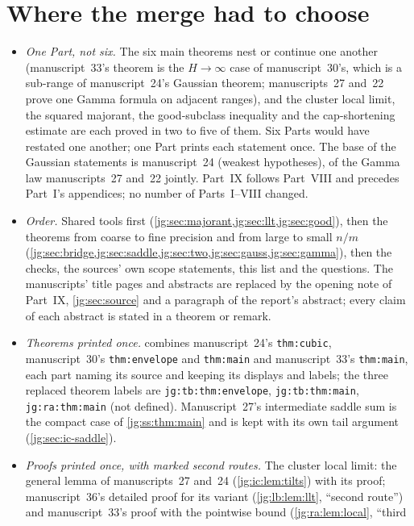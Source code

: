 \documentclass[11pt,a4paper]{article}
\theoremstyle{definition}\newaliascnt{definition}{theorem}
\theoremstyle{remark}\newaliascnt{remark}{theorem}
\begin{document}
\section{Where the merge had to choose}
\label{jg:sec:merge}
\begin{itemize}
\item \emph{One Part, not six.} The six main theorems nest or continue one
 another (manuscript~33's theorem is the $H\to\infty$ case of manuscript~30's,
 which is a sub-range of manuscript~24's Gaussian theorem; manuscripts~27
 and~22 prove one Gamma formula on adjacent ranges), and the cluster local
 limit, the squared majorant, the good-subclass inequality and the
 cap-shortening estimate are each proved in two to five of them. Six Parts would
 have restated one another; one Part prints each statement once. The base of
 the Gaussian statements is manuscript~24 (weakest hypotheses), of the Gamma law
 manuscripts~27 and~22 jointly. Part~IX follows Part~VIII and precedes Part~I's
 appendices; no number of Parts~I--VIII changed.
\item \emph{Order.} Shared tools first (\cref{jg:sec:majorant,jg:sec:llt,jg:sec:good}),
 then the theorems from coarse to fine precision and from large to small $n/m$
 (\cref{jg:sec:bridge,jg:sec:saddle,jg:sec:two,jg:sec:gauss,jg:sec:gamma}),
 then the checks, the sources' own scope statements, this list and the
 questions. The manuscripts' title pages and abstracts are replaced by the
 opening note of Part~IX, \cref{jg:sec:source} and a paragraph of the report's
 abstract; every claim of each abstract is stated in a theorem or remark.
\item \emph{Theorems printed once.}  combines manuscript~24's
 \texttt{thm:cubic}, manuscript~30's \texttt{thm:envelope} and \texttt{thm:main}
 and manuscript~33's \texttt{thm:main}, each part naming its source and keeping
 its displays and labels; the three replaced theorem labels are
 \texttt{jg:tb:thm:envelope}, \texttt{jg:tb:thm:main}, \texttt{jg:ra:thm:main}
 (not defined). Manuscript~27's intermediate saddle sum is the compact case of
 \cref{jg:ss:thm:main} and is kept with its own tail argument
 (\cref{jg:sec:ic-saddle}).
\item \emph{Proofs printed once, with marked second routes.} The cluster local
 limit: the general lemma of manuscripts~27 and~24
 (\cref{jg:ic:lem:tilts}) with its proof; manuscript~36's
 detailed proof for its variant (\cref{jg:lb:lem:llt}, ``second route'') and
 manuscript~33's proof with the pointwise bound (\cref{jg:ra:lem:local}, ``third

\end{itemize}
\end{document}
